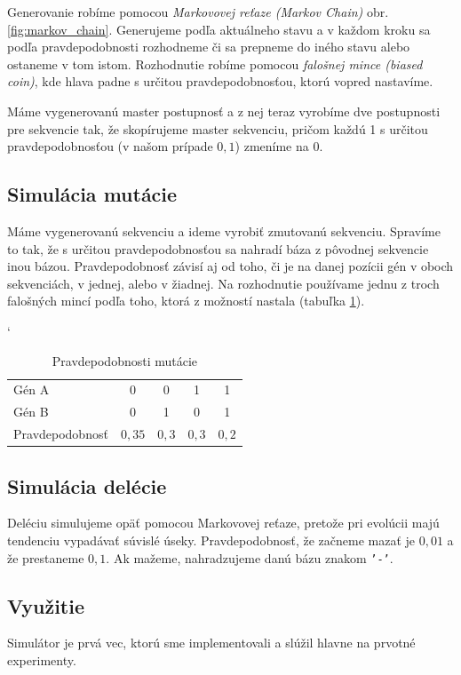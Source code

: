 Generovanie robíme pomocou \textit{Markovovej reťaze (Markov Chain)} obr. \ref{fig:markov_chain}. Generujeme podľa aktuálneho stavu a v každom kroku sa podľa pravdepodobnosti rozhodneme či sa prepneme do iného stavu alebo ostaneme v tom istom. Rozhodnutie robíme pomocou \textit{falošnej mince (biased coin)}, kde hlava padne s určitou pravdepodobnosťou, ktorú vopred nastavíme.


Máme vygenerovanú master postupnosť a z nej teraz vyrobíme dve postupnosti pre sekvencie tak, že skopírujeme master sekvenciu, pričom každú 1 s určitou pravdepodobnosťou (v našom prípade $0,1$) zmeníme na 0.

\subsection{Simulácia mutácie}

Máme vygenerovanú sekvenciu a ideme vyrobiť zmutovanú sekvenciu. Spravíme to tak, že s určitou pravdepodobnosťou sa nahradí báza z pôvodnej sekvencie inou bázou. Pravdepodobnosť závisí aj od toho, či je na danej pozícii gén v oboch sekvenciách, v jednej, alebo v žiadnej. Na rozhodnutie používame jednu z troch falošných mincí podľa toho, ktorá z možností nastala (tabuľka \ref{tab:mutation_prob}).

\begin{table}[h]
\catcode` %
\centering
\begin{tabular}{lcccc}
Gén A & 0 & 0 & 1 & 1\\
Gén B & 0 & 1 & 0 & 1\\
Pravdepodobnosť & $0,35$ & $0,3$ & $0,3$ & $0,2$\\
\end{tabular}
\caption{Pravdepodobnosti mutácie}
\label{tab:mutation_prob}
\end{table}

\subsection{Simulácia delécie}
Deléciu simulujeme opäť pomocou Markovovej reťaze, pretože pri evolúcii majú tendenciu vypadávať súvislé úseky. Pravdepodobnosť, že začneme mazať je $0,01$ a že prestaneme $0,1$.
Ak mažeme, nahradzujeme danú bázu znakom {\tt '-'}. 

\subsection{Využitie}

Simulátor je prvá vec, ktorú sme implementovali a slúžil hlavne na prvotné experimenty.
